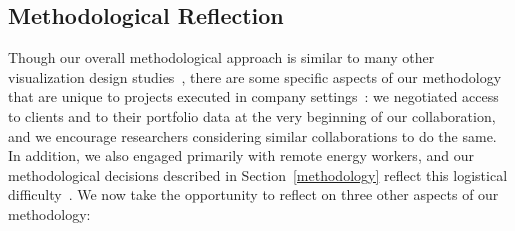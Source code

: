 \documentclass[journal]{vgtc}                %
\newcommand*\rot{\scriptsize \rotatebox{90}}
\newcommand*\OK{\ding{51}}
\begin{document}

\subsection{Methodological Reflection}
\label{discussion-methodology}


Though our overall methodological approach is similar to many other visualization design studies~\cite{McKenna2014,Sedlmair2012}, there are some specific aspects of our methodology that are unique to projects executed in company settings~\cite{Sedlmair2011}: we negotiated access to clients and to their portfolio data at the very beginning of our collaboration, and we encourage researchers considering similar collaborations to do the same.
In addition, we also engaged primarily with remote energy workers, and our methodological decisions described in Section~\ref{methodology} reflect this logistical difficulty~\cite{Brehmer2014a}.
We now take the opportunity to reflect on three other aspects of our methodology:

    
    
        

    
        
        
        
        
        
\end{document}
